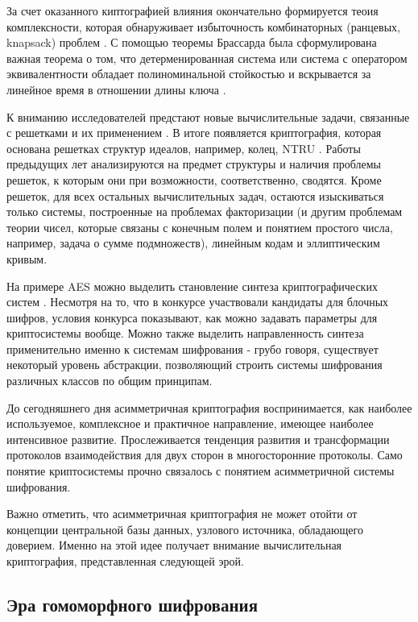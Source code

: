      За счет оказанного киптографией влияния окончательно формируется теоия комплексности, которая обнаруживает избыточность комбинаторных (ранцевых, knapsack) проблем \cite{Galore-93}.  С помощью теоремы Брассарда была сформулирована важная теорема о том, что детерменированная система или система с оператором эквивалентности обладает полиноминальной стойкостью и вскрывается за линейное время в отношении длины ключа \cite{BonehBlackBox-96}.\par
     К вниманию исследователей предстают новые вычислительные задачи, связанные с решетками и их применением \cite{WorstAverage-97} \cite{LatticesHard-96} \cite{CryptoLatticeReduction-97}. В итоге появляется криптография, которая основана решетках структур идеалов, например, колец, NTRU \cite{NTRU-98}. Работы предыдущих лет анализируются на предмет структуры и наличия проблемы решеток, к которым они при возможности, соответственно, сводятся. Кроме решеток, для всех остальных вычислительных задач, остаются изыскиваться только системы, построенные на проблемах факторизации (и другим проблемам теории чисел, которые связаны с конечным полем и понятием простого числа, например, задача о сумме подмножеств), линейным кодам и эллиптическим кривым.\par
     На примере AES можно выделить становление синтеза криптографических систем \cite{SusanNewCentury-00}. Несмотря на то, что в конкурсе участвовали кандидаты для блочных шифров, условия конкурса показывают, как можно задавать параметры для криптосистемы вообще. Можно также выделить направленность синтеза применительно именно к системам шифрования - грубо говоря, существует некоторый уровень абстракции, позволяющий строить системы шифрования различных классов по общим принципам.\par
     До сегодняшнего дня асимметричная криптография воспринимается, как наиболее используемое, комплексное и практичное направление, имеющее наиболее интенсивное развитие. Прослеживается тенденция развития и трансформации протоколов взаимодействия для двух сторон в многосторонние протоколы. Само понятие криптосистемы  прочно связалось с понятием асимметричной системы шифрования.\par
     Важно отметить, что асимметричная криптография не может отойти от концепции центральной базы данных, узлового источника, обладающего доверием. Именно на этой идее получает внимание вычислительная криптография, представленная следующей эрой.\par

   \subsection{Эра гомоморфного шифрования} \label{subsec:ch1/sec1/sub3}

